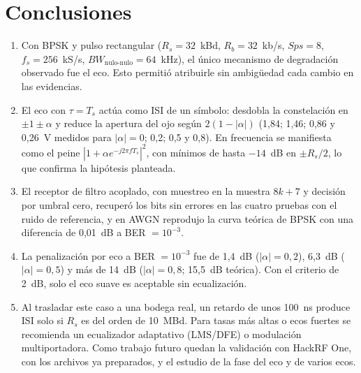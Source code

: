 \section{Conclusiones}

\begin{enumerate}
    \item Con BPSK y pulso rectangular ($R_s=32$~kBd, $R_b=32$~kb/s, $Sps=8$, $f_s=256$~kS/s, $BW_{\text{nulo-nulo}}=64$~kHz), el único mecanismo de degradación observado fue el eco. Esto permitió atribuirle sin ambigüedad cada cambio en las evidencias.
    \item El eco con $\tau=T_s$ actúa como ISI de un símbolo: desdobla la constelación en $\pm1\pm\alpha$ y reduce la apertura del ojo según $2(1-|\alpha|)$ (1,84; 1,46; 0,86 y 0,26~V medidos para $|\alpha|=0$; 0,2; 0,5 y 0,8). En frecuencia se manifiesta como el peine $|1+\alpha e^{-j2\pi fT_s}|^2$, con mínimos de hasta $-14$~dB en $\pm R_s/2$, lo que confirma la hipótesis planteada.
    \item El receptor de filtro acoplado, con muestreo en la muestra $8k+7$ y decisión por umbral cero, recuperó los bits sin errores en las cuatro pruebas con el ruido de referencia, y en AWGN reprodujo la curva teórica de BPSK con una diferencia de 0,01~dB a BER $=10^{-3}$.
    \item La penalización por eco a BER $=10^{-3}$ fue de 1,4~dB ($|\alpha|=0{,}2$), 6,3~dB ($|\alpha|=0{,}5$) y más de 14~dB ($|\alpha|=0{,}8$; 15,5~dB teórica). Con el criterio de 2~dB, solo el eco suave es aceptable sin ecualización.
    \item Al trasladar este caso a una bodega real, un retardo de unos 100~ns produce ISI solo si $R_s$ es del orden de 10~MBd. Para tasas más altas o ecos fuertes se recomienda un ecualizador adaptativo (LMS/DFE) o modulación multiportadora. Como trabajo futuro quedan la validación con HackRF One, con los archivos ya preparados, y el estudio de la fase del eco y de varios ecos.
\end{enumerate}
